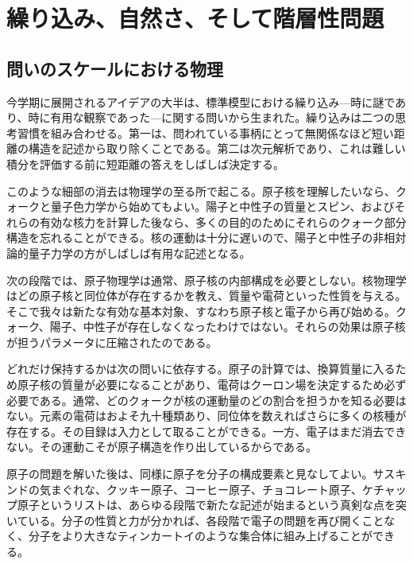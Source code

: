 \chapter{繰り込み、自然さ、そして階層性問題}


\section{問いのスケールにおける物理}

今学期に展開されるアイデアの大半は、標準模型における繰り込み---時に謎であり、時に有用な観察であった---に関する問いから生まれた。繰り込みは二つの思考習慣を組み合わせる。第一は、問われている事柄にとって無関係なほど短い距離の構造を記述から取り除くことである。第二は次元解析であり、これは難しい積分を評価する前に短距離の答えをしばしば決定する。

このような細部の消去は物理学の至る所で起こる。原子核を理解したいなら、クォークと量子色力学から始めてもよい。陽子と中性子の質量とスピン、およびそれらの有効な核力を計算した後なら、多くの目的のためにそれらのクォーク部分構造を忘れることができる。核の運動は十分に遅いので、陽子と中性子の非相対論的量子力学の方がしばしば有用な記述となる。

次の段階では、原子物理学は通常、原子核の内部構成を必要としない。核物理学はどの原子核と同位体が存在するかを教え、質量や電荷といった性質を与える。そこで我々は新たな有効な基本対象、すなわち原子核と電子から再び始める。クォーク、陽子、中性子が存在しなくなったわけではない。それらの効果は原子核が担うパラメータに圧縮されたのである。

どれだけ保持するかは次の問いに依存する。原子の計算では、換算質量に入るため原子核の質量が必要になることがあり、電荷はクーロン場を決定するため必ず必要である。通常、どのクォークが核の運動量のどの割合を担うかを知る必要はない。元素の電荷はおよそ九十種類あり、同位体を数えればさらに多くの核種が存在する。その目録は入力として取ることができる。一方、電子はまだ消去できない。その運動こそが原子構造を作り出しているからである。

原子の問題を解いた後は、同様に原子を分子の構成要素と見なしてよい。サスキンドの気まぐれな、クッキー原子、コーヒー原子、チョコレート原子、ケチャップ原子というリストは、あらゆる段階で新たな記述が始まるという真剣な点を突いている。分子の性質と力が分かれば、各段階で電子の問題を再び開くことなく、分子をより大きなティンカートイのような集合体に組み上げることができる。

